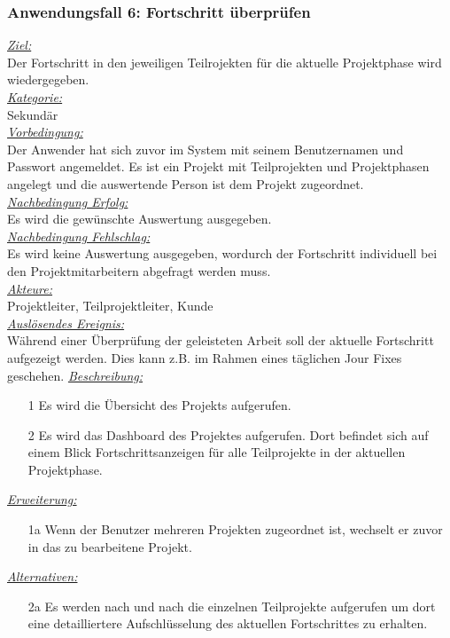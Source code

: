\newpage
\subsubsection{Anwendungsfall 6: Fortschritt überprüfen}
\underline{\emph{Ziel:}}\\
Der Fortschritt in den jeweiligen Teilrojekten für die aktuelle Projektphase wird wiedergegeben.\\
\underline{\emph{Kategorie:}} \\
Sekundär\\
\underline{\emph{Vorbedingung:}} \\
Der Anwender hat sich zuvor im System mit seinem Benutzernamen und Passwort angemeldet. Es ist ein Projekt mit Teilprojekten und Projektphasen angelegt und die auswertende Person ist dem Projekt zugeordnet.\\
\underline{\emph{Nachbedingung Erfolg:}} \\
Es wird die gewünschte Auswertung ausgegeben.\\
\underline{\emph{Nachbedingung Fehlschlag:}} \\
Es wird keine Auswertung ausgegeben, wordurch der Fortschritt individuell bei den Projektmitarbeitern abgefragt werden muss.\\
\underline{\emph{Akteure:}} \\
Projektleiter, Teilprojektleiter, Kunde\\
\underline{\emph{Auslösendes Ereignis:}} \\
Während einer Überprüfung der geleisteten Arbeit soll der aktuelle Fortschritt aufgezeigt werden. Dies kann z.B. im Rahmen eines täglichen Jour Fixes geschehen.
\underline{\emph{Beschreibung:}} 
\begin{itemize}
    \item [1] Es wird die Übersicht des Projekts aufgerufen.
    \item [2] Es wird das Dashboard des Projektes aufgerufen. Dort befindet sich auf einem Blick Fortschrittsanzeigen für alle Teilprojekte in der aktuellen Projektphase.
\end{itemize}
\underline{\emph{Erweiterung:}}
\begin{itemize}
    \item [1a] Wenn der Benutzer mehreren Projekten zugeordnet ist, wechselt er zuvor in das zu bearbeitene Projekt.
\end{itemize}
\underline{\emph{Alternativen:}}
\begin{itemize}
    \item [2a] Es werden nach und nach die einzelnen Teilprojekte aufgerufen um dort eine detailliertere Aufschlüsselung des aktuellen Fortschrittes zu erhalten.
\end{itemize}


